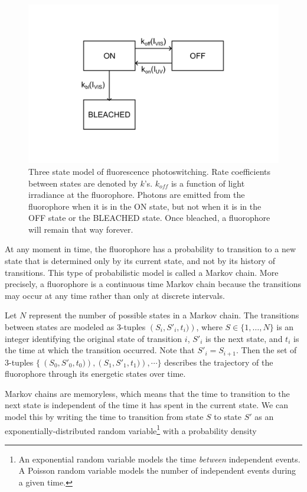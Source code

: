 \documentclass[10pt,a4paper]{book}
\begin{document}
\begin{figure}[ht]
    \centering
    \includegraphics{three-state-photoswitching-model.png}
    \caption{Three state model of fluorescence photoswitching. Rate coefficients between states are denoted by $k$'s. $k_{off}$ is a function of light irradiance at the fluorophore. Photons are emitted from the fluorophore when it is in the ON state, but not when it is in the OFF state or the BLEACHED state. Once bleached, a fluorophore will remain that way forever.}
    \label{fig:three-state-photoswitching}
\end{figure}

At any moment in time, the fluorophore has a probability to transition to a new state that is determined only by its current state, and not by its history of transitions. This type of probabilistic model is called a Markov chain. More precisely, a fluorophore is a continuous time Markov chain because the transitions may occur at any time rather than only at discrete intervals.

Let $N$ represent the number of possible states in a Markov chain. The transitions between states are modeled as 3-tuples $\left(S_{i}, S'_{i}, t_i)\right)$, where $S \in \{ 1, \ldots, N \} $ is an integer identifying the original state of transition $i$, $S'_{i}$ is the next state, and $t_i$ is the time at which the transition occurred. Note that $S'_{i} = S_{i + 1}$. Then the set of 3-tuples $\{\ \left(S_{0}, S'_{0}, t_0)\right), \left(S_{1}, S'_{1}, t_{1})\right), \cdots \}$ describes the trajectory of the fluorophore through its energetic states over time.

Markov chains are memoryless, which means that the time to transition to the next state is independent of the time it has spent in the current state. We can model this by writing the time to transition from state $S$ to state $S'$ as an exponentially-distributed random variable\footnote{An exponential random variable models the time \textit{between} independent events. A Poisson random variable models the number of independent events during a given time.} with a probability density
\end{document}
